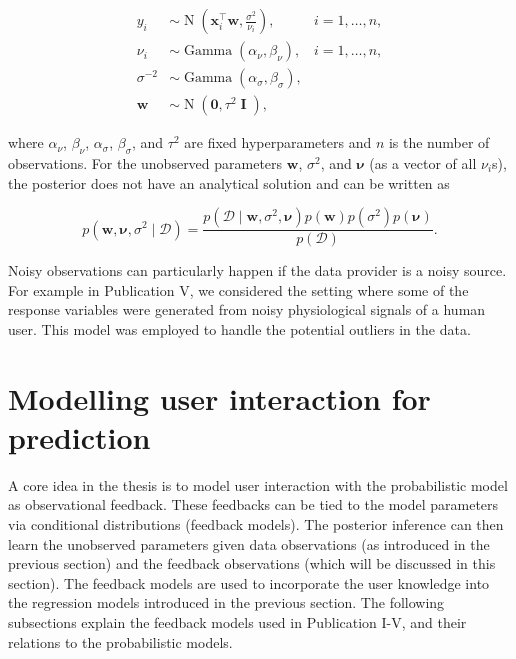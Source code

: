 \documentclass[dissertation,math,vertlayout,pdfa,colorlinks]{aaltoseries}
\newcommand{\bw}{\bm{w}}
\newcommand{\bD}{\mathcal{D}}
\DeclareMathOperator{\eye}{\textbf{I}}
\DeclareMathOperator{\normalpdf}{N}
\DeclareMathOperator{\gammapdf}{Gamma}
\newcommand{\tp}{^{\top}}
\begin{document}
	
\begin{align}\label{Eq:ard_Bayesian_regression}
y_i &\sim \normalpdf(\bm{x}_i\tp\bw,\frac{\sigma^2}{\nu_i}),  & i=1,\ldots,n,\\
\nu_i &\sim \gammapdf(\alpha_{\nu}, \beta_{\nu}), & i=1,\ldots,n,\nonumber \\
\sigma^{-2} &\sim \gammapdf(\alpha_{\sigma}, \beta_{\sigma}), \nonumber \\
\bw &\sim \normalpdf(\textbf{0},\tau^2 \eye), \nonumber
\end{align}

\noindent where $\alpha_{\nu}$, $\beta_{\nu}$, $\alpha_{\sigma}$, $\beta_{\sigma}$, and $\tau^2$ are fixed hyperparameters and $n$ is the number of observations. For the unobserved parameters $\bw$, $\sigma^2$, and $\bm{\nu}$ (as a vector of all $\nu_i$s), the posterior does not have an analytical solution and can be written as

\begin{equation}\label{Eq:Bayes_rule_ARD}
p(\bw, \bm{\nu}, \sigma^2 \mid \bD) = \frac{p(\bD \mid \bw, \sigma^2, \bm{\nu})p(\bw)p(\sigma^2)p(\bm{\nu})}{p(\bD)}.
\end{equation} 

Noisy observations can particularly happen if the data provider is a noisy source. For example in Publication V, we considered the setting where some of the response variables were generated from noisy physiological signals of a human user. This model was employed to handle the potential outliers in the data. 



\section{Modelling user interaction for prediction}\label{prob_model_user}

A core idea in the thesis is to model user interaction with the probabilistic model as observational feedback. These feedbacks can be tied to the model parameters via conditional distributions (feedback models). The posterior inference can then learn the unobserved parameters given data observations (as introduced in the previous section) and the feedback observations (which will be discussed in this section). The feedback models are used to incorporate the user knowledge into the regression models introduced in the previous section. The following subsections explain the feedback models used in Publication I-V, and their relations to the probabilistic models.
\end{document}
